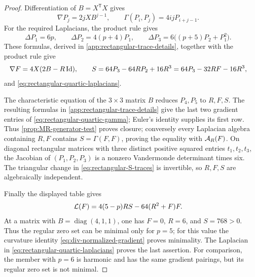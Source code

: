 \begin{proof}
Differentiation of
\(B=X^{\mathsf T}X\) gives
\begin{equation}\label{eq:rectangular-trace-differentiation}
 \nabla P_j=2jXB^{j-1},\qquad
 \Gamma(P_i,P_j)=4ijP_{i+j-1}.
\end{equation}
For the required Laplacians, the product rule gives
\[
 \Delta P_1=6p,\qquad
 \Delta P_2=4(p+4)P_1,\qquad
 \Delta P_3=6\bigl((p+5)P_2+P_1^2\bigr).
\]
These formulas, derived in \cref{app:rectangular-trace-details},
together with the product rule give
\begin{equation}\label{eq:rectangular-S-traces}
 \nabla F=4X(2B-R\operatorname{Id}),\qquad
 S=64P_3-64RP_2+16R^3
  =64P_3-32RF-16R^3,
\end{equation}
and \eqref{eq:rectangular-quartic-laplacians}.

The characteristic equation of the $3\times3$ matrix $B$ reduces
$P_4,P_5$ to $R,F,S$. The resulting formulas in
\cref{app:rectangular-trace-details} give the last two gradient
entries of \eqref{eq:rectangular-quartic-gamma}; Euler's identity
supplies its first row. Thus \cref{prop:MR-generator-test} proves closure;
conversely every Laplacian algebra containing \(R,F\) contains
\(S=\Gamma(F,F)\), proving the equality with \(\mathcal A_R(F)\).
On diagonal rectangular matrices with three distinct positive squared
entries \(t_1,t_2,t_3\), the Jacobian of
\((P_1,P_2,P_3)\) is a nonzero Vandermonde determinant times six.
The triangular change in \eqref{eq:rectangular-S-traces} is invertible,
so \(R,F,S\) are algebraically independent.

Finally the displayed table gives
\[
 \mathcal L(F)=4(5-p)RS-64(R^2+F)F.
\]
At a matrix with \(B=\operatorname{diag}(4,1,1)\), one has
\(F=0\), \(R=6\), and \(S=768>0\). Thus the regular zero
set can be minimal only for \(p=5\); for this value the curvature
identity \eqref{eq:div-normalized-gradient} proves minimality.
The Laplacian in \eqref{eq:rectangular-quartic-laplacians} proves
the last assertion. For comparison, the member with \(p=6\) is
harmonic and has the same gradient pairings, but its regular zero
set is not minimal.
\end{proof}

